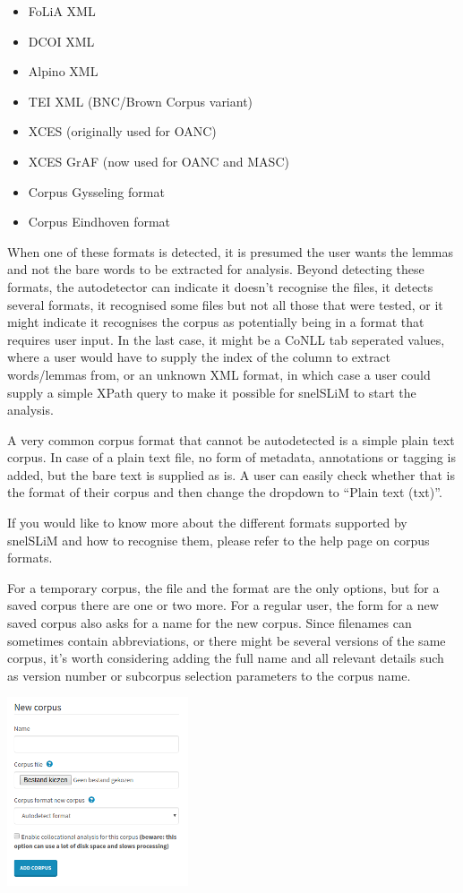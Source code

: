 \documentclass[11pt,a4paper]{article}
\begin{document}
\begin{itemize}
    \item FoLiA XML
    \item DCOI XML
    \item Alpino XML
    \item TEI XML (BNC/Brown Corpus variant)
    \item XCES (originally used for OANC)
    \item XCES GrAF (now used for OANC and MASC)
    \item Corpus Gysseling format
    \item Corpus Eindhoven format
\end{itemize}

When one of these formats is detected, it is presumed the user wants the lemmas and not the bare words to be extracted for analysis. Beyond detecting these formats, the autodetector can indicate it doesn't recognise the files, it detects several formats, it recognised some files but not all those that were tested, or it might indicate it recognises the corpus as potentially being in a format that requires user input. In the last case, it might be a CoNLL tab seperated values, where a user would have to supply the index of the column to extract words/lemmas from, or an unknown XML format, in which case a user could supply a simple XPath query to make it possible for snelSLiM to start the analysis.

A very common corpus format that cannot be autodetected is a simple plain text corpus. In case of a plain text file, no form of metadata, annotations or tagging is added, but the bare text is supplied as is. A user can easily check whether that is the format of their corpus and then change the dropdown to ``Plain text (txt)''. 

If you would like to know more about the different formats supported by snelSLiM and how to recognise them, please refer to the help page on corpus formats.

For a temporary corpus, the file and the format are the only options, but for a saved corpus there are one or two more. For a regular user, the form for a new saved corpus also asks for a name for the new corpus. Since filenames can sometimes contain abbreviations, or there might be several versions of the same corpus, it's worth considering adding the full name and all relevant details such as version number or subcorpus selection parameters to the corpus name.

\centerline{\includegraphics[width=0.4\textwidth]{images/uploadmycorpora.png}}
\end{document}
